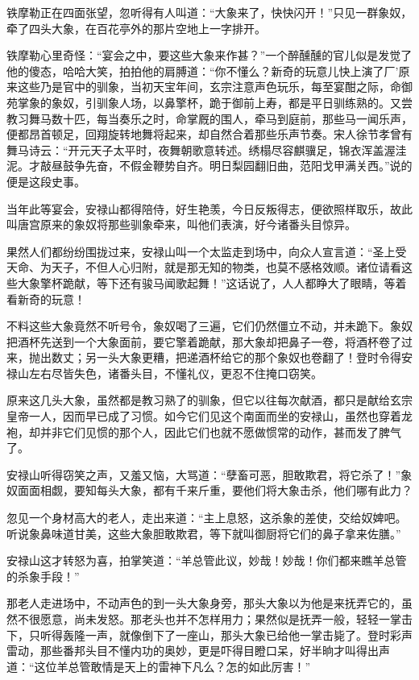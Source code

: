\documentclass[12pt,oneside]{book}
\begin{document}
铁摩勒正在四面张望，忽听得有人叫道：``大象来了，快快闪开！''只见一群象奴，牵了四头大象，在百花亭外的那片空地上一字排开。

铁摩勒心里奇怪：``宴会之中，要这些大象来作甚？''一个醉醺醺的官儿似是发觉了他的傻态，哈哈大笑，拍拍他的肩膊道：``你不懂么？新奇的玩意儿快上演了厂'原来这些乃是官中的驯象，当初天宝年间，玄宗注意声色玩乐，每至宴酣之际，命御苑掌象的象奴，引驯象人场，以鼻擎杯，跪于御前上寿，都是平日驯练熟的。又尝教习舞马数十匹，每当奏乐之时，命掌厩的围人，牵马到庭前，那些马一闻乐声，便都昂首顿足，回翔旋转地舞将起来，却自然合着那些乐声节奏。宋人徐节孝曾有舞马诗云：``开元天子太平时，夜舞朝歌意转述。绣榻尽容麒骥足，锦衣浑盖渥洼泥。才敲昼鼓争先奋，不假金鞭势自齐。明日梨园翻旧曲，范阳戈甲满关西。''说的便是这段史事。

当年此等宴会，安禄山都得陪侍，好生艳羡，今日反叛得志，便欲照样取乐，故此叫唐宫原来的象奴将那些驯象牵来，叫他们表演，好今诸番头目惊异。

果然人们都纷纷围拢过来，安禄山叫一个太监走到场中，向众人宣言道：``圣上受天命、为天子，不但人心归附，就是那无知的物类，也莫不感格效顺。诸位请看这些大象擎杯跪献，等下还有骏马闻歌起舞！''这话说了，人人都睁大了眼睛，等着看新奇的玩意！

不料这些大象竟然不听号令，象奴喝了三遍，它们仍然僵立不动，并未跪下。象奴把酒杯先送到一个大象面前，要它擎着跪献，那大象却把鼻子一卷，将酒杯卷了过来，抛出数丈；另一头大象更糟，把递酒杯给它的那个象奴也卷翻了！登时令得安禄山左右尽皆失色，诸番头目，不懂礼仪，更忍不住掩口窃笑。

原来这几头大象，虽然都是教习熟了的驯象，但它以往每次献酒，都只是献给玄宗皇帝一人，因而早已成了习惯。如今它们见这个南面而坐的安禄山，虽然也穿着龙袍，却并非它们见惯的那个人，因此它们也就不愿做惯常的动作，甚而发了脾气了。

安禄山听得窃笑之声，又羞又恼，大骂道：``孽畜可恶，胆敢欺君，将它杀了！''象奴面面相觑，要知每头大象，都有千来斤重，要他们将大象击杀，他们哪有此力？

忽见一个身材高大的老人，走出来道：``主上息怒，这杀象的差使，交给奴婢吧。听说象鼻味道甘美，这些大象胆敢欺君，等下就叫御厨将它们的鼻子拿来佐膳。''

安禄山这才转怒为喜，拍掌笑道：``羊总管此议，妙哉！妙哉！你们都来瞧羊总管的杀象手段！''

那老人走进场中，不动声色的到一头大象身旁，那头大象以为他是来抚弄它的，虽然不很愿意，尚未发怒。那老头也并不怎样用力；果然似是抚弄一般，轻轻一掌击下，只听得轰隆一声，就像倒下了一座山，那头大象已给他一掌击毙了。登时彩声雷动，那些番邦头目不懂内功的奥妙，更是吓得目瞪口呆，好半晌才叫得出声道：``这位羊总管敢情是天上的雷神下凡么？怎的如此厉害！''
\end{document}
